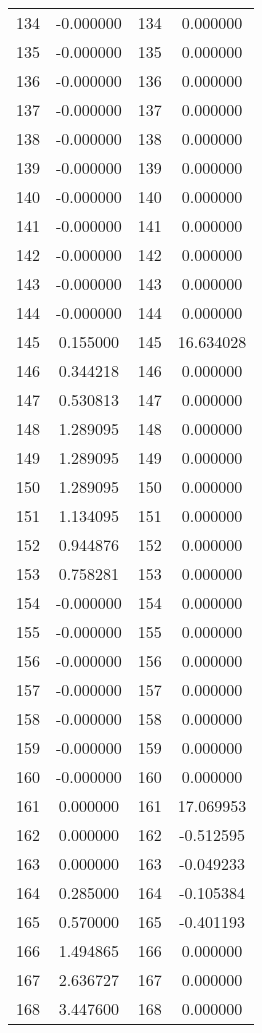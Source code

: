 \documentclass[12pt]{article}
\begin{document}
\begin{longtable}{@{}cccc@{}}
134 & -0.000000 & 134 & 0.000000 \\
135 & -0.000000 & 135 & 0.000000 \\
136 & -0.000000 & 136 & 0.000000 \\
137 & -0.000000 & 137 & 0.000000 \\
138 & -0.000000 & 138 & 0.000000 \\
139 & -0.000000 & 139 & 0.000000 \\
140 & -0.000000 & 140 & 0.000000 \\
141 & -0.000000 & 141 & 0.000000 \\
142 & -0.000000 & 142 & 0.000000 \\
143 & -0.000000 & 143 & 0.000000 \\
144 & -0.000000 & 144 & 0.000000 \\
145 & 0.155000 & 145 & 16.634028 \\
146 & 0.344218 & 146 & 0.000000 \\
147 & 0.530813 & 147 & 0.000000 \\
148 & 1.289095 & 148 & 0.000000 \\
149 & 1.289095 & 149 & 0.000000 \\
150 & 1.289095 & 150 & 0.000000 \\
151 & 1.134095 & 151 & 0.000000 \\
152 & 0.944876 & 152 & 0.000000 \\
153 & 0.758281 & 153 & 0.000000 \\
154 & -0.000000 & 154 & 0.000000 \\
155 & -0.000000 & 155 & 0.000000 \\
156 & -0.000000 & 156 & 0.000000 \\
157 & -0.000000 & 157 & 0.000000 \\
158 & -0.000000 & 158 & 0.000000 \\
159 & -0.000000 & 159 & 0.000000 \\
160 & -0.000000 & 160 & 0.000000 \\
161 & 0.000000 & 161 & 17.069953 \\
162 & 0.000000 & 162 & -0.512595 \\
163 & 0.000000 & 163 & -0.049233 \\
164 & 0.285000 & 164 & -0.105384 \\
165 & 0.570000 & 165 & -0.401193 \\
166 & 1.494865 & 166 & 0.000000 \\
167 & 2.636727 & 167 & 0.000000 \\
168 & 3.447600 & 168 & 0.000000 \\

\end{longtable}
\end{document}
